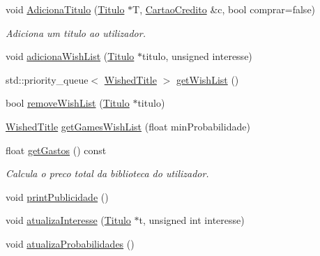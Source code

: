 \begin{DoxyCompactItemize}
void \mbox{\hyperlink{class_utilizador_ac08a744b9d9d2aca0bd22c60e0beaa83}{Adiciona\+Titulo}} (\mbox{\hyperlink{class_titulo}{Titulo}} $\ast$T, \mbox{\hyperlink{class_cartao_credito}{Cartao\+Credito}} \&c, bool comprar=false)
\begin{DoxyCompactList}\small\item\em Adiciona um titulo ao utilizador. \end{DoxyCompactList}\item 
void \mbox{\hyperlink{class_utilizador_a45ee0a8d988adbd537e2506d80f96cfb}{adiciona\+Wish\+List}} (\mbox{\hyperlink{class_titulo}{Titulo}} $\ast$titulo, unsigned interesse)
\item 
std\+::priority\+\_\+queue$<$ \mbox{\hyperlink{class_wished_title}{Wished\+Title}} $>$ \mbox{\hyperlink{class_utilizador_a8624e9e45e13e592e68164b0d7b2b7cd}{get\+Wish\+List}} ()
\item 
bool \mbox{\hyperlink{class_utilizador_aa47c2fe835a73a23664149ccc7fbc10f}{remove\+Wish\+List}} (\mbox{\hyperlink{class_titulo}{Titulo}} $\ast$titulo)
\item 
\mbox{\hyperlink{class_wished_title}{Wished\+Title}} \mbox{\hyperlink{class_utilizador_a9b80c93b8e8f7716e4ab77b2e1b47071}{get\+Games\+Wish\+List}} (float min\+Probabilidade)
\item 
float \mbox{\hyperlink{class_utilizador_a2fc6ea78068d43766a6bc344a3059f61}{get\+Gastos}} () const
\begin{DoxyCompactList}\small\item\em Calcula o preco total da biblioteca do utilizador. \end{DoxyCompactList}\item 
void \mbox{\hyperlink{class_utilizador_a4f3016ff86d68d548f801aa569b854dc}{print\+Publicidade}} ()
\item 
void \mbox{\hyperlink{class_utilizador_a4617169b0764e48f8b95d4d8aa12bf19}{atualiza\+Interesse}} (\mbox{\hyperlink{class_titulo}{Titulo}} $\ast$t, unsigned int interesse)
\item 
void \mbox{\hyperlink{class_utilizador_a82b216e27c9716cce49a7b98d59445cb}{atualiza\+Probabilidades}} ()
\end{DoxyCompactItemize}
